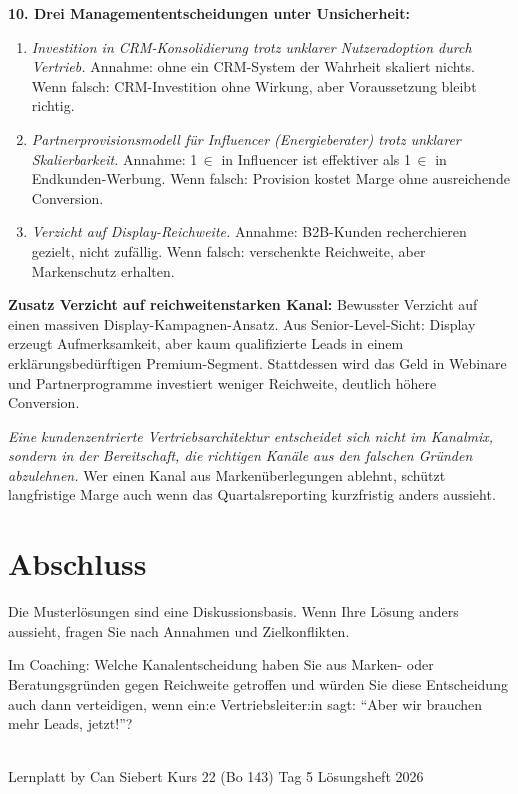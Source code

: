 \documentclass[11pt,a4paper,oneside]{article}
\begin{document}
\begin{loesungbox}
\textbf{10. Drei Managemententscheidungen unter Unsicherheit:}
\begin{enumerate}
  \item \emph{Investition in CRM-Konsolidierung trotz unklarer Nutzeradoption durch Vertrieb.} Annahme: ohne ein CRM-System der Wahrheit skaliert nichts. Wenn falsch: CRM-Investition ohne Wirkung, aber Voraussetzung bleibt richtig.
  \item \emph{Partnerprovisionsmodell für Influencer (Energieberater) trotz unklarer Skalierbarkeit.} Annahme: 1\,$\in$ in Influencer ist effektiver als 1\,$\in$ in Endkunden-Werbung. Wenn falsch: Provision kostet Marge ohne ausreichende Conversion.
  \item \emph{Verzicht auf Display-Reichweite.} Annahme: B2B-Kunden recherchieren gezielt, nicht zufällig. Wenn falsch: verschenkte Reichweite, aber Markenschutz erhalten.
\end{enumerate}

\textbf{Zusatz \textendash{} Verzicht auf reichweitenstarken Kanal:}
Bewusster Verzicht auf einen massiven Display-Kampagnen-Ansatz. Aus Senior-Level-Sicht: Display erzeugt Aufmerksamkeit, aber kaum qualifizierte Leads in einem erklärungsbedürftigen Premium-Segment. Stattdessen wird das Geld in Webinare und Partnerprogramme investiert \textendash{} weniger Reichweite, deutlich höhere Conversion.

\begin{merkbox}
\emph{Eine kundenzentrierte Vertriebsarchitektur entscheidet sich nicht im Kanalmix, sondern in der Bereitschaft, die richtigen Kanäle aus den falschen Gründen abzulehnen.} Wer einen Kanal aus Markenüberlegungen ablehnt, schützt langfristige Marge \textendash{} auch wenn das Quartalsreporting kurzfristig anders aussieht.
\end{merkbox}
\end{loesungbox}

\clearpage

\section*{Abschluss}
\thispagestyle{plain}

\noindent Die Musterlösungen sind eine Diskussionsbasis. Wenn Ihre Lösung anders aussieht, fragen Sie nach Annahmen und Zielkonflikten.

\medskip
\begin{infobox}
Im Coaching: Welche Kanalentscheidung haben Sie aus Marken- oder Beratungsgründen gegen Reichweite getroffen \textendash{} und würden Sie diese Entscheidung auch dann verteidigen, wenn ein:e Vertriebsleiter:in sagt: ``Aber wir brauchen mehr Leads, jetzt!''?
\end{infobox}

\vspace{1cm}
\noindent{\color{lpAccent}\rule{\linewidth}{0.6pt}}\\[4pt]
{\footnotesize\sffamily\color{lpGray}Lernplatt \textperiodcentered{} by Can Siebert \textperiodcentered{} Kurs 22 (Bo 143) \textperiodcentered{} Tag 5 \textperiodcentered{} Lösungsheft \textperiodcentered{} \textcopyright{} 2026}
\end{document}
